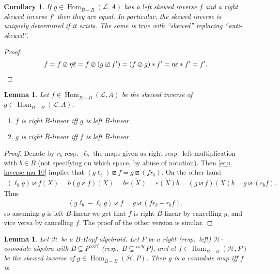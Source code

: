 \documentclass[a4paper,reqno]{amsart}
\DeclareMathOperator{\Hom}{Hom}
\numberwithin{equation}{section}
\theoremstyle{plain}
\newtheorem{lem}[thm]{Lemma}
\newtheorem{cor}[thm]{Corollary}
\theoremstyle{remark}
\numberwithin{equation}{section}
\newcommand\ol{\overline}
\newcommand{\BB}{\overline{B}}
\newcommand{\CH}{\mathcal{H}}
\newcommand{\CL}{\mathcal{L}}
\newcommand\skpr{\varoslash}
\newcommand\askpr{\boxslash}
\begin{document}
\begin{cor}\label{cor. skew inverse is unique}
  If $g\in\Hom_{\ol B-B}(\CL,A)$ has a left skewed inverse $f$ and a right skewed inverse $f'$ then they are equal. In particular, the skewed inverse is uniquely determined if it exists. The same is true with ``skewed'' replacing ``anti-skewed''. 
\end{cor}
\begin{proof}
    \[f=f\skpr\eta\ol\varepsilon=f\skpr(g\askpr f')=(f\skpr g)*f'=\eta\varepsilon*f'=f'.\]
\end{proof}

\begin{lem}\label{skew inverse and linearity}
    Let $f\in\Hom_{B-\ol B}(\CL,A)$ be the skewed inverse of $g\in\Hom_{\ol B-B}(\CL,A)$. 
    \begin{enumerate}
        \item $f$ is right $B$-linear iff $g$ is left $B$-linear.
        \item $g$ is right $\ol B$-linear iff $f$ is left $\ol B$-linear.
    \end{enumerate} 
\end{lem}
\begin{proof} 
  Denote by $r_b$ resp.\ $\ell_b$ the maps given as right resp.\ left multiplication with $b\in B$ (not specifying on which space, by abuse of notation). Then \cref{equ. inverse mu 10} implies that $(g\ell_b)\askpr f=g\askpr(fr_b).$ On the other hand 
  \begin{align*}
      (\ell_bg)\askpr f(X)=b(g\askpr f)(X)=b\ol{\varepsilon(X)}=\ol{\varepsilon(X)}b=(g\askpr f)(X)b=g\askpr(r_bf).
  \end{align*}
  Thus
  \begin{align*}
      (g\ell_b-\ell_bg)\askpr f=g\askpr(fr_b-r_bf),
  \end{align*}
  so assuming $g$ is left $B$-linear we get that $f$ is right $B$-linear by cancelling $g$, and vice versa by cancelling $f$. The proof of the other version is similar.
  \end{proof}
\begin{lem}\label{lem. skew inverse of also colinear}
    Let $\CH$ be a $B$-Hopf algebroid.
    Let $P$ be a right (resp.\ left) $\CH$-comodule algebra with $B\subseteq P^{co\CH}$ (resp.\ $\BB\subseteq {}^{co\CH}P$), and et $f\in\Hom_{B-\ol B}(\CH,P)$ be the skewed inverse of $g\in\Hom_{\ol B-B}(\CH,P)$. Then $g$ is a comodule map iff $f$ is.
\end{lem}
\end{document}
